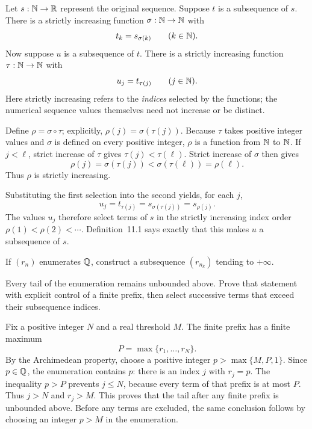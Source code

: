 Let $s:\mathbb{N}\to\mathbb{R}$ represent the original sequence.
Suppose $t$ is a subsequence of $s$. There is a strictly increasing
function $\sigma:\mathbb{N}\to\mathbb{N}$ with
\[
 t_k=s_{\sigma(k)}\qquad(k\in\mathbb{N}).
\]
Now suppose $u$ is a subsequence of $t$. There is a strictly
increasing function $\tau:\mathbb{N}\to\mathbb{N}$ with
\[
 u_j=t_{\tau(j)}\qquad(j\in\mathbb{N}).
\]
Here strictly increasing refers to the \emph{indices} selected by
the functions; the numerical sequence values themselves need not
increase or be distinct.

Define $\rho=\sigma\circ\tau$; explicitly,
$\rho(j)=\sigma(\tau(j))$.
Because $\tau$ takes positive integer values and $\sigma$ is defined
on every positive integer, $\rho$ is a function from $\mathbb{N}$ to $\mathbb{N}$.
If $j<\ell$, strict increase of $\tau$ gives
$\tau(j)<\tau(\ell)$. Strict increase of $\sigma$ then gives
\[
 \rho(j)=\sigma(\tau(j))
 <\sigma(\tau(\ell))=\rho(\ell).
\]
Thus $\rho$ is strictly increasing.

Substituting the first selection into the second yields, for each $j$,
\[
 u_j=t_{\tau(j)}
     =s_{\sigma(\tau(j))}
     =s_{\rho(j)}.
\]
The values $u_j$ therefore select terms of $s$ in the strictly
increasing index order $\rho(1)<\rho(2)<\cdots$.
Definition~11.1 says exactly that this makes $u$ a subsequence of $s$.


\goal If $(r_n)$ enumerates $\mathbb{Q}$, construct a subsequence
$(r_{n_k})$ tending to $+\infty$.

\idea Every tail of the enumeration remains unbounded above.
Prove that statement with explicit control of a finite prefix,
then select successive terms that exceed their subsequence indices.

Fix a positive integer $N$ and a real threshold $M$.
The finite prefix has a finite maximum
\[
 P=\max\{r_1,\ldots,r_N\}.
\]
By the Archimedean property, choose a positive integer
$p>\max\{M,P,1\}$. Since $p\in\mathbb{Q}$, the enumeration contains $p$:
there is an index $j$ with $r_j=p$.
The inequality $p>P$ prevents $j\le N$, because every term of
that prefix is at most $P$. Thus $j>N$ and $r_j>M$.
This proves that the tail after any finite prefix is unbounded above.
Before any terms are excluded, the same conclusion follows by
choosing an integer $p>M$ in the enumeration.

